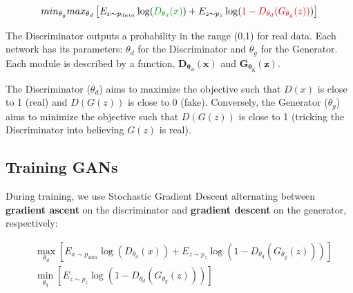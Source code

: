 \vspace{-0.8cm}
{\Large

\begin{equation*}
min_{\theta_{g}} max_{\theta_{d}}\left[E_{x \sim p_{data}}  \log (\textcolor{mygreen}{D_{\tikzmarkk{Y}\theta_{d}}(x)}) + E_{z \sim p_{z}}\log (\textcolor{myred}{1-D_{\tikzmarkk{YC}\theta_{d}}(G_{\theta_{g}}(z))})  \right]
\end{equation*}
}

\vspace{1.4cm}
The Discriminator outputs a probability in the range (0,1) for real data. Each network has its parameters: \(\theta_{d}\) for the Discriminator and \(\theta_{g}\) for the Generator. Each module is described by a function, \(\mathbf{D_{\theta_{d}}(x)}\) and \(\mathbf{G_{\theta_{g}}(z)}\). 

The Discriminator (\(\theta_{d}\)) aims to maximize the objective such that \(D(x)\) is close to 1 (real) and \(D(G(z))\) is close to 0 (fake). Conversely, the Generator (\(\theta_{g}\)) aims to minimize the objective such that \(D(G(z))\) is close to 1 (tricking the Discriminator into believing \(G(z)\) is real).


\subsection{Training GANs}
During training, we use Stochastic Gradient Descent alternating between \textbf{gradient ascent} on the discriminator and \textbf{gradient descent} on the generator, respectively:

\vspace{-0.5cm}
{\Large
\begin{equation*}
\begin{aligned}
    &\max_{\theta_{d}} \left[E_{x \sim p_{data}} \log (D_{\theta_{d}}(x)) + E_{z \sim p_{z}} \log (1 - D_{\theta_{d}}(G_{\theta_{g}}(z))) \right] \\
    &\min_{\theta_{g}} \left[E_{z \sim p_{z}} \log (1 - D_{\theta_{d}}(G_{\theta_{g}}(z))) \right]
\end{aligned}
\end{equation*}
}

